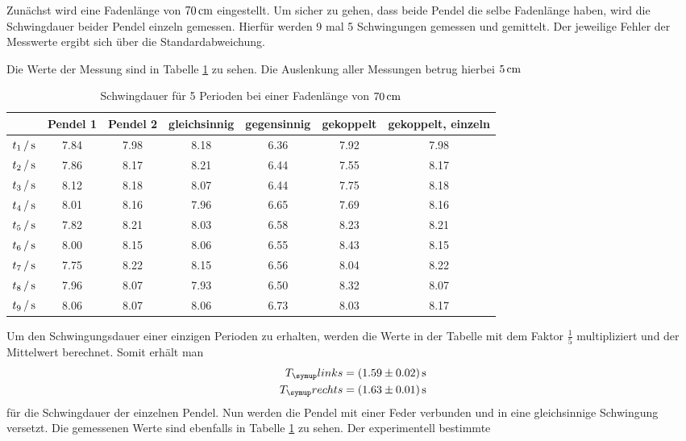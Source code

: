 Zunächst wird eine Fadenlänge von $70\,\si{\centi\meter}$ eingestellt. Um sicher zu gehen, dass
beide Pendel die selbe Fadenlänge haben, wird die Schwingdauer beider Pendel
einzeln gemessen. Hierfür werden 9 mal 5 Schwingungen gemessen und gemittelt.
Der jeweilige Fehler der Messwerte ergibt sich über die Standardabweichung.

Die Werte der Messung sind in Tabelle \ref{tab:70cm} zu sehen. Die Auslenkung
aller Messungen betrug hierbei $5\,\si{\centi\meter}$
\begin{table}[H]
  \centering
  \begin{tabular}{c | c c c c c c}
    \toprule
    &Pendel 1& Pendel 2 & gleichsinnig & gegensinnig &gekoppelt&
    gekoppelt, einzeln \\
    \midrule
    $t_1\,/\,\si{\second}$ & 7.84 & 7.98 & 8.18 & 6.36 & 7.92 & 7.98 \\
    $t_2\,/\,\si{\second}$ & 7.86 & 8.17 & 8.21 & 6.44 & 7.55 & 8.17 \\
    $t_3\,/\,\si{\second}$ & 8.12 & 8.18 & 8.07 & 6.44 & 7.75 & 8.18 \\
    $t_4\,/\,\si{\second}$ & 8.01 & 8.16 & 7.96 & 6.65 & 7.69 & 8.16 \\
    $t_5\,/\,\si{\second}$ & 7.82 & 8.21 & 8.03 & 6.58 & 8.23 & 8.21 \\
    $t_6\,/\,\si{\second}$ & 8.00 & 8.15 & 8.06 & 6.55 & 8.43 & 8.15 \\
    $t_7\,/\,\si{\second}$ & 7.75 & 8.22 & 8.15 & 6.56 & 8.04 & 8.22 \\
    $t_8\,/\,\si{\second}$ & 7.96 & 8.07 & 7.93 & 6.50 & 8.32 & 8.07 \\
    $t_9\,/\,\si{\second}$ & 8.06 & 8.07 & 8.06 & 6.73 & 8.03 & 8.17 \\
    \bottomrule
  \end{tabular}
  \caption{Schwingdauer für 5 Perioden bei einer Fadenlänge von $70\,\si{\centi\meter}$}
  \label{tab:70cm}
\end{table}
Um den Schwingungsdauer einer einzigen Perioden zu erhalten, werden die Werte
in der Tabelle mit dem Faktor $\frac{1}{5}$ multipliziert und der Mittelwert
berechnet. Somit erhält man
\begin{align*}
T_\su{links}&=(1.59\pm0.02)\sek \\
T_\su{rechts}&=(1.63\pm0.01)\sek
\end{align*}
für die Schwingdauer der einzelnen Pendel. Nun werden die Pendel mit einer Feder
verbunden und in eine gleichsinnige Schwingung versetzt. Die gemessenen Werte
sind ebenfalls in Tabelle \ref{tab:70cm} zu sehen. Der experimentell bestimmte
